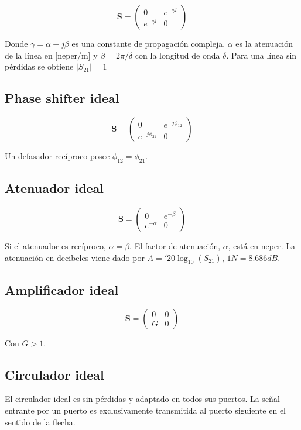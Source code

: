 $$
\mathbf{S} = \begin{pmatrix} 0 & e^{-\gamma l}\\e^{-\gamma l} & 0\end{pmatrix}
$$

Donde $\gamma = \alpha + j\beta$ es una constante de propagación compleja. $\alpha$ es la atenuación de la línea en [neper/m] 
y $\beta = 2\pi/\delta$ con la longitud de onda $\delta$. Para una línea sin pérdidas se obtiene $|S_{21}| = 1$

\subsection{Phase shifter ideal}

$$
\mathbf{S} = \begin{pmatrix} 0 & e^{-j\phi_{12}}\\e^{-j\phi_{21}} & 0\end{pmatrix}
$$

Un defasador recíproco posee $\phi_{12} = \phi_{21}$.

\subsection{Atenuador ideal}

$$
\mathbf{S} = \begin{pmatrix} 0 & e^{-\beta}\\e^{-\alpha} & 0\end{pmatrix}
$$

Si el atenuador es recíproco, $\alpha = \beta$. El factor de atenuación, $\alpha$, está en neper. La atenuación en decibeles
viene dado por $A = '20\log_{10}(S_{21})$, $1N = 8.686dB$.


\subsection{Amplificador ideal}

$$
\mathbf{S} = \begin{pmatrix} 0 & 0\\G & 0\end{pmatrix}
$$

Con $G > 1$.


\subsection{Circulador ideal}

El circulador ideal es sin pérdidas y adaptado en todos sus puertos. La señal entrante por un puerto es exclusivamente 
transmitida al puerto siguiente en el sentido de la flecha.

